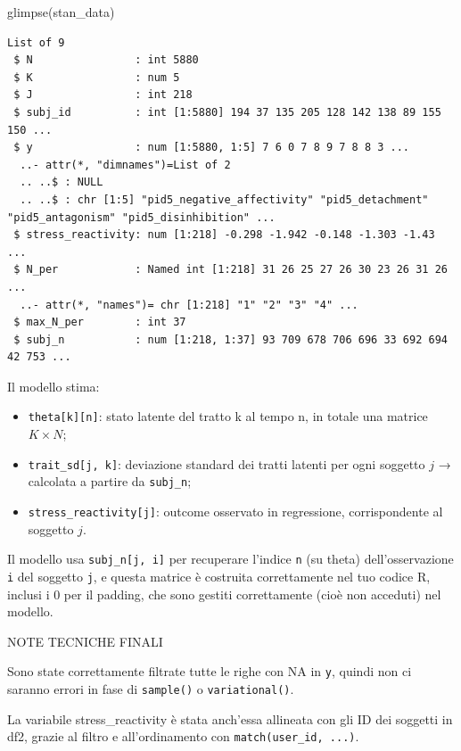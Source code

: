 \documentclass[
  11pt,
  a4paper,
  onecolumn]{article}
\newenvironment{Shaded}{}{}
\newcommand{\FunctionTok}[1]{\textcolor[rgb]{0.44,0.26,0.76}{#1}}
\newcommand{\NormalTok}[1]{\textcolor[rgb]{0.14,0.16,0.18}{#1}}
\providecommand{\tightlist}{%
  \setlength{\itemsep}{0pt}\setlength{\parskip}{0pt}}
\begin{document}
\begin{Shaded}
\begin{Highlighting}[]
\FunctionTok{glimpse}\NormalTok{(stan\_data)}
\end{Highlighting}
\end{Shaded}

\begin{verbatim}
List of 9
 $ N                : int 5880
 $ K                : num 5
 $ J                : int 218
 $ subj_id          : int [1:5880] 194 37 135 205 128 142 138 89 155 150 ...
 $ y                : num [1:5880, 1:5] 7 6 0 7 8 9 7 8 8 3 ...
  ..- attr(*, "dimnames")=List of 2
  .. ..$ : NULL
  .. ..$ : chr [1:5] "pid5_negative_affectivity" "pid5_detachment" "pid5_antagonism" "pid5_disinhibition" ...
 $ stress_reactivity: num [1:218] -0.298 -1.942 -0.148 -1.303 -1.43 ...
 $ N_per            : Named int [1:218] 31 26 25 27 26 30 23 26 31 26 ...
  ..- attr(*, "names")= chr [1:218] "1" "2" "3" "4" ...
 $ max_N_per        : int 37
 $ subj_n           : num [1:218, 1:37] 93 709 678 706 696 33 692 694 42 753 ...
\end{verbatim}

Il modello stima:

\begin{itemize}
\tightlist
\item
  \texttt{theta{[}k{]}{[}n{]}}: stato latente del tratto k al tempo n,
  in totale una matrice \(K \times N\);
\item
  \texttt{trait\_sd{[}j,\ k{]}}: deviazione standard dei tratti latenti
  per ogni soggetto \(j\) → calcolata a partire da \texttt{subj\_n};
\item
  \texttt{stress\_reactivity{[}j{]}}: outcome osservato in regressione,
  corrispondente al soggetto \(j\).
\end{itemize}

Il modello usa \texttt{subj\_n{[}j,\ i{]}} per recuperare l'indice
\texttt{n} (su theta) dell'osservazione \texttt{i} del soggetto
\texttt{j}, e questa matrice è costruita correttamente nel tuo codice R,
inclusi i 0 per il padding, che sono gestiti correttamente (cioè non
acceduti) nel modello.

NOTE TECNICHE FINALI

Sono state correttamente filtrate tutte le righe con NA in \texttt{y},
quindi non ci saranno errori in fase di \texttt{sample()} o
\texttt{variational()}.

La variabile stress\_reactivity è stata anch'essa allineata con gli ID
dei soggetti in df2, grazie al filtro e all'ordinamento con
\texttt{match(user\_id,\ ...)}.
\end{document}

